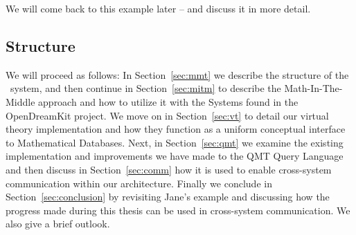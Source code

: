 We will come back to this example later -- and discuss it in more detail. 

\subsection{Structure}\label{sec:intro:toc}

We will proceed as follows:
In Section~\ref{sec:mmt} we describe the structure of the \mmt\ system, 
and then continue in Section~\ref{sec:mitm} to describe the Math-In-The-Middle approach and how to utilize it with the Systems found in the OpenDreamKit project. 
We move on in Section~\ref{sec:vt} to detail our virtual theory implementation and how they function as a uniform conceptual interface to Mathematical Databases. 
Next, in Section~\ref{sec:qmt} we examine the existing implementation and improvements we have made to the QMT Query Language 
and then discuss in Section~\ref{sec:comm} how it is used to enable cross-system communication within our architecture. 
Finally we conclude in Section~\ref{sec:conclusion} by revisiting Jane's example and discussing how the progress made during this thesis can be used in cross-system communication. 
We also give a brief outlook. 